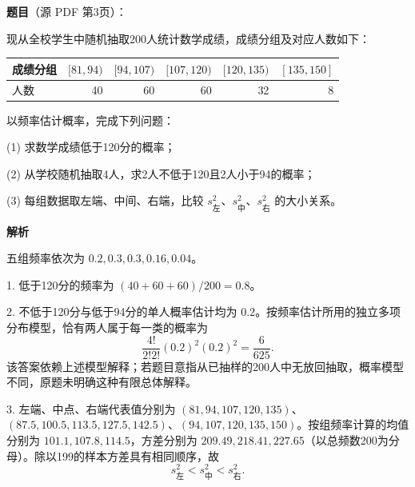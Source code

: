 \begin{answer}

\textbf{题目}（源 PDF 第3页）：

现从全校学生中随机抽取200人统计数学成绩，成绩分组及对应人数如下：

\begin{center}
\begin{tabular}{lrrrrr}
\toprule
成绩分组 & \([81,94)\) & \([94,107)\) & \([107,120)\) & \([120,135)\) & \([135,150]\) \\
\midrule
人数 & 40 & 60 & 60 & 32 & 8 \\
\bottomrule
\end{tabular}
\end{center}

以频率估计概率，完成下列问题：

(1) 求数学成绩低于120分的概率；

(2) 从学校随机抽取4人，求2人不低于120且2人小于94的概率；

(3) 每组数据取左端、中间、右端，比较 \(s_{\text{左}}^2\text{、}s_{\text{中}}^2\text{、}s_{\text{右}}^2\) 的大小关系。

\textbf{解析}

五组频率依次为 \(0.2,0.3,0.3,0.16,0.04\)。


1. 低于120分的频率为 \((40+60+60)/200=0.8\)。

2. 不低于120分与低于94分的单人概率估计均为 \(0.2\)。按频率估计所用的独立多项分布模型，恰有两人属于每一类的概率为
\nopagebreak[4]
\[
   \frac{4!}{2!2!}(0.2)^2(0.2)^2=\frac6{625}.
\]
   该答案依赖上述模型解释；若题目意指从已抽样的200人中无放回抽取，概率模型不同，原题未明确这种有限总体解释。

3. 左端、中点、右端代表值分别为 \((81,94,107,120,135)\)、\((87.5,100.5,113.5,127.5,142.5)\)、\((94,107,120,135,150)\)。按组频率计算的均值分别为 \(101.1,107.8,114.5\)，方差分别为 \(209.49,218.41,227.65\)（以总频数200为分母）。除以199的样本方差具有相同顺序，故
\nopagebreak[4]
\[
   s_{\text{左}}^2<s_{\text{中}}^2<s_{\text{右}}^2.
\]




\end{answer}
